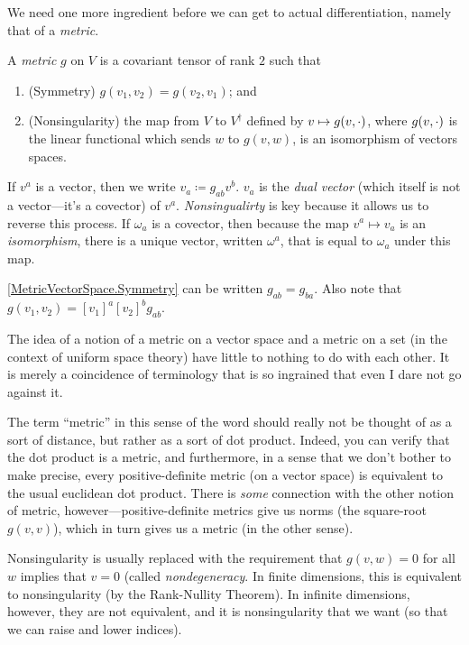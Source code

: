 We need one more ingredient before we can get to actual differentiation, namely that of a \emph{metric}.
\begin{dfn}\label{MetricVectorSpace}
A \emph{metric} $g$ on $V$ is a covariant tensor of rank $2$ such that
\begin{enumerate}
\item \label{MetricVectorSpace.Symmetry}(Symmetry) $g(v_1,v_2)=g(v_2,v_1)$; and
\item \label{MetricVectorSpace.Nonsingularity}(Nonsingularity) the map from $V$ to $V^{\dagger}$ defined by $v\mapsto g(v,{\cdot} )$, where $g(v,{\cdot} )$ is the linear functional which sends $w$ to $g(v,w)$, is an isomorphism of vectors spaces.
\end{enumerate}
\begin{rmk}
If $v^a$ is a vector, then we write $v_a\coloneqq g_{ab}v^b$.  $v_a$ is the \emph{dual vector} (which itself is not a vector---it's a covector) of $v^a$.  \emph{Nonsingualirty} is key because it allows us to reverse this process.  If $\omega _a$ is a covector, then because the map $v^a\mapsto v_a$ is an \emph{isomorphism}, there is a unique vector, written $\omega ^a$, that is equal to $\omega _a$ under this map.
\end{rmk}
\begin{rmk}
\ref{MetricVectorSpace.Symmetry} can be written $g_{ab}=g_{ba}$.  Also note that $g(v_1,v_2)=[v_1]^a[v_2]^bg_{ab}$.
\end{rmk}
\begin{rmk}
The idea of a notion of a metric on a vector space and a metric on a set (in the context of uniform space theory) have little to nothing to do with each other.  It is merely a coincidence of terminology that is so ingrained that even I dare not go against it.
\end{rmk}
\begin{rmk}
The term ``metric'' in this sense of the word should really not be thought of as a sort of distance, but rather as a sort of dot product.  Indeed, you can verify that the dot product is a metric, and furthermore, in a sense that we don't bother to make precise, every positive-definite metric (on a vector space) is equivalent to the usual euclidean dot product.  There is \emph{some} connection with the other notion of metric, however---positive-definite metrics give us norms (the square-root $g(v,v)$), which in turn gives us a metric (in the other sense).
\end{rmk}
\begin{rmk}
Nonsingularity is usually replaced with the requirement that $g(v,w)=0$ for all $w$ implies that $v=0$ (called \emph{nondegeneracy}.  In finite dimensions, this is equivalent to nonsingularity (by the Rank-Nullity Theorem).  In infinite dimensions, however, they are not equivalent, and it is nonsingularity that we want (so that we can raise and lower indices).
\end{rmk}
\end{dfn}
